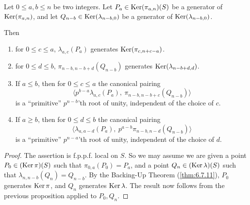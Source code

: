 \begin{kprop}\label{prop:7.9.3}
Let $0 \leq a, b \leq n$ be two integers. Let $P_a \in \operatorname{Ker}(\pi_{a,n})(S)$ be a generator of $\operatorname{Ker}(\pi_{a,n})$, and let $Q_{n-b} \in \operatorname{Ker}(\lambda_{n-b,0})$ be a generator of $\operatorname{Ker}(\lambda_{n-b,0})$.
\begin{center}
\end{center}
Then
\begin{enumerate}[(1)]
\item for $0 \leq c \leq a$, $\lambda_{a,c}(P_a)$ generates $\operatorname{Ker}(\pi_{c,n+c-a})$.
\item for $0 \leq d \leq b$, $\pi_{n-b,n-b+d}(Q_{n-b})$ generates $\operatorname{Ker}(\lambda_{n-b+d,d})$.
\item If $a \leq b$, then for $0 \leq c \leq a$ the canonical pairing
\[
\langle p^{b-a} \lambda_{a,c}(P_a),\ \pi_{n-b,n-b+c}(Q_{n-b}) \rangle
\]
is a ``primitive'' $p^{n-b}$'th root of unity, independent of the choice of $c$.
\item[(3 bis)] If $a \geq b$, then for $0 \leq d \leq b$ the canonical pairing
\[
\langle \lambda_{a,a-d}(P_a),\ p^{a-b} \pi_{n-b,n-d}(Q_{n-b}) \rangle
\]
is a ``primitive'' $p^{n-a}$'th root of unity, independent of the choice of $d$.
\end{enumerate}
\end{kprop}

\begin{proof}
The assertion is f.p.p.f. local on $S$. So we may assume we are given a point $P_0 \in (\operatorname{Ker} \pi)(S)$ such that $\pi_{0,a}(P_0) = P_a$, and a point $Q_n \in (\operatorname{Ker} \lambda)(S)$ such that $\lambda_{n,n-b}(Q_n) = Q_{n-b}$. By the Backing-Up Theorem (\ref{thm:6.7.11}), $P_0$ generates $\operatorname{Ker} \pi$, and $Q_n$ generates $\operatorname{Ker} \lambda$. The result now follows from the previous proposition applied to $P_0, Q_n$.
\end{proof}

